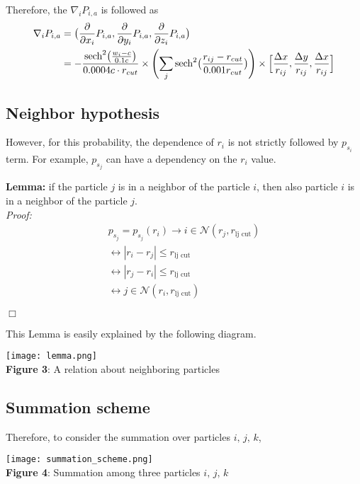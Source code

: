 \documentclass[11pt, oneside]{article}   	%
\begin{document}
Therefore, the $\nabla_i P_{i,a}$ is followed as
\begin{align}
\nabla_i {P_{i,a}} & = \bigl( \frac{\partial}{\partial x_i} P_{i,a}, \frac{\partial}{\partial y_i} P_{i,a}, \frac{\partial}{\partial z_i} P_{i,a} \bigr) \notag \\
&= - \frac{\textrm{sech}^2 \bigl( \frac{w_i-c}{0.1c} \bigr)  }{0.0004c\cdot r_{cut}} \times \Biggl( \sum_j \textrm{sech}^2 \bigl(\frac{r_{ij}-r_{cut}}{0.001r_{cut}}\bigr) \Biggr) \times \Big[\frac{\Delta x}{r_{ij}}, \frac{\Delta y}{r_{ij}}, \frac{\Delta x}{r_{ij}}\Big] 
\end{align}

\subsection{Neighbor hypothesis}
However, for this probability, the dependence of $r_i$ is not strictly followed by $p_{s_i}$ term. For example, $p_{s_j}$ can have a dependency on the $r_i$ value.

\begin{flushleft}
\textbf{Lemma:} if the particle $j$ is in a neighbor of the particle $i$, then also particle $i$ is in a neighbor of the particle $j$.\\
\textit{Proof:} 
\begin{align*}
p_{s_j} = p_{s_j} (r_i) \rightarrow i \in \mathcal{N}(r_j,r_{\textrm{lj cut}}) \\
\leftrightarrow |r_i - r_j| \leq r_{\textrm{lj cut}} \\
\leftrightarrow |r_j - r_i| \leq r_{\textrm{lj cut}} \\
\leftrightarrow j \in \mathcal{N}(r_i,r_{\textrm{lj cut}})
\end{align*}
\begin{flushright}
$\Box$
\end{flushright}
\end{flushleft}
This Lemma is easily explained by the following diagram.
\begin{center}
\texttt{[image: lemma.png]} \\
\textbf{Figure 3}: A relation about neighboring particles
\end{center}
\subsection{Summation scheme}
Therefore, to consider the summation over particles $i,\,j,\,k$,  

\begin{center}
\texttt{[image: summation\_scheme.png]} \\
\textbf{Figure 4}: Summation among three particles $i,\,j,\,k$
\end{center}
\end{document}

